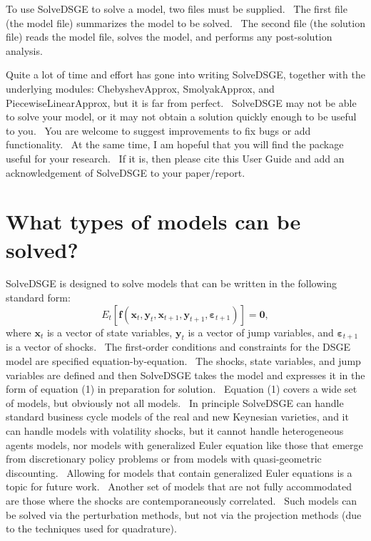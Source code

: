 \documentclass[notitlepage,11pt]{article}
\begin{document}
To use SolveDSGE to solve a model, two files must be supplied. \ The first
file (the model file) summarizes the model to be solved. \ The second file
(the solution file) reads the model file, solves the model, and performs any
post-solution analysis.

Quite a lot of time and effort has gone into writing SolveDSGE, together
with the underlying modules: ChebyshevApprox, SmolyakApprox, and
PiecewiseLinearApprox, but it is far from perfect. \ SolveDSGE may not be
able to solve your model, or it may not obtain a solution quickly enough to
be useful to you. \ You are welcome to suggest improvements to fix bugs or
add functionality. \ At the same time, I am hopeful that you will find the
package useful for your research. \ If it is, then please cite this User
Guide and add an acknowledgement of SolveDSGE to your paper/report.

\section{What types of models can be solved?}

SolveDSGE is designed to solve models that can be written in the following
standard form:%
\begin{equation}
E_{t}\left[ \mathbf{f}\left( \mathbf{x}_{t},\mathbf{y}_{t},\mathbf{x}_{t+1},%
\mathbf{y}_{t+1},\mathbf{\varepsilon }_{t+1}\right) \right] =\mathbf{0},
\end{equation}%
where $\mathbf{x}_{t}$ is a vector of state variables, $\mathbf{y}_{t}$ is a
vector of jump variables, and $\mathbf{\varepsilon }_{t+1}$ is a vector of
shocks. \ The first-order conditions and constraints for the DSGE model are
specified equation-by-equation. \ The shocks, state variables, and jump
variables are defined and then SolveDSGE takes the model and expresses it in
the form of equation (1) in preparation for solution. \ Equation (1) covers
a wide set of models, but obviously not all models. \ In principle SolveDSGE
can handle standard business cycle models of the real and new Keynesian
varieties, and it can handle models with volatility shocks, but it cannot
handle heterogeneous agents models, nor models with generalized Euler
equation like those that emerge from discretionary policy problems or from
models with quasi-geometric discounting. \ Allowing for models that contain
generalized Euler equations is a topic for future work. \ Another set of
models that are not fully accommodated are those where the shocks are
contemporaneously correlated. \ Such models can be solved via the
perturbation methods, but not via the projection methods (due to the
techniques used for quadrature).
\end{document}
